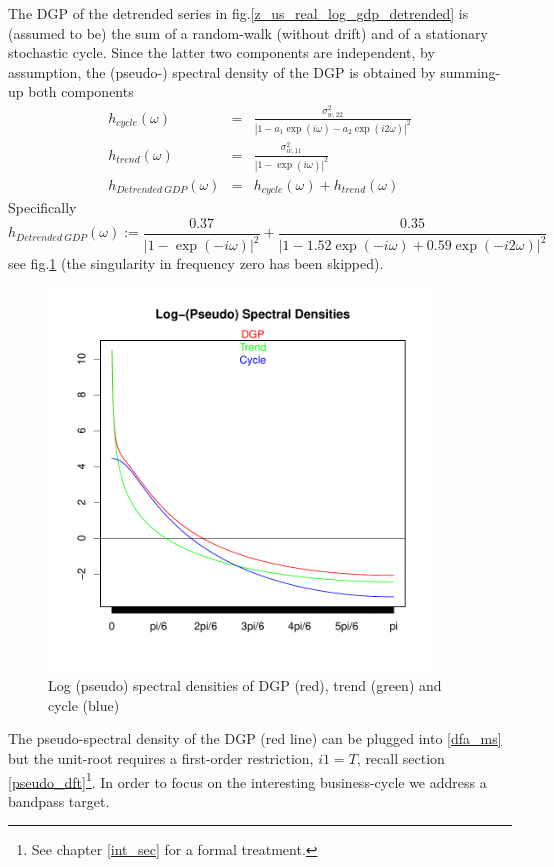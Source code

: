 \documentclass[a4paper]{book}
\begin{document}
The DGP of the detrended series in fig.\ref{z_us_real_log_gdp_detrended} is (assumed to be) the sum of a random-walk (without drift) and of a stationary stochastic cycle. Since the latter two components are independent, by assumption, the (pseudo-) spectral density of the DGP is obtained by summing-up both components
\begin{eqnarray*}
h_{cycle}(\omega)&=&\frac{\sigma_{w,22}^2}{|1-a_1\exp(i\omega)-a_2\exp(i2\omega)|^2}\\
h_{trend}(\omega)&=&\frac{\sigma_{w,11}^2}{|1-\exp(i\omega)|^2}\\
h_{Detrended~GDP}(\omega)&=&h_{cycle}(\omega)+h_{trend}(\omega)
\end{eqnarray*}
Specifically
\[h_{Detrended~GDP}(\omega):=\frac{0.37}{|1-\exp(-i\omega)|^2}+\frac{0.35}{|1-1.52\exp(-i\omega)+0.59\exp(-i2\omega)|^2}\]
see fig.\ref{z_us_real_log_gdp_detrended_spect} (the singularity in frequency zero has been skipped).
\begin{figure}[H]\begin{center}\includegraphics[height=4in, width=4in]{z_us_real_log_gdp_detrended_spect}\caption{Log (pseudo) spectral densities of DGP (red), trend (green) and cycle (blue) \label{z_us_real_log_gdp_detrended_spect}}\end{center}\end{figure}The pseudo-spectral density of the DGP (red line) can be plugged into \ref{dfa_ms} but the unit-root requires a first-order restriction, $i1=T$, recall section \ref{pseudo_dft}\footnote{See chapter \ref{int_sec} for a formal treatment.}. In order to focus on the interesting business-cycle we address a bandpass target.
\end{document}
